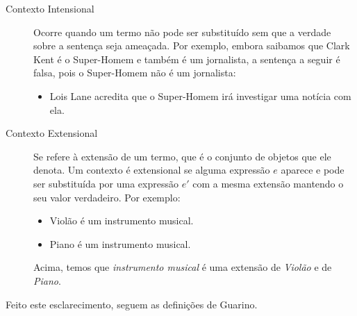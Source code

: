 \begin{description}
	\item[Contexto Intensional] Ocorre quando um termo não pode ser substituído sem que a verdade sobre a sentença seja ameaçada. Por exemplo, embora saibamos que Clark Kent é o Super-Homem e também é um jornalista, a sentença a seguir é falsa, pois o Super-Homem não é um jornalista:
	\begin{itemize}
		\item Lois Lane acredita que o Super-Homem irá investigar uma notícia com ela. 
	\end{itemize}
	\item[Contexto Extensional] Se refere à extensão de um termo, que é o conjunto de objetos que ele denota. Um contexto é extensional se alguma expressão $ e $ aparece e pode ser substituída por uma expressão $ e' $ com a mesma extensão mantendo o seu valor verdadeiro. Por exemplo: 
	\begin{itemize}
		\item Violão é um instrumento musical.
		\item Piano é um instrumento musical.
	\end{itemize}
	Acima, temos que \textit{instrumento musical} é uma extensão de \textit{Violão} e de \textit{Piano}.	
\end{description}

Feito este esclarecimento, seguem as definições de Guarino.

